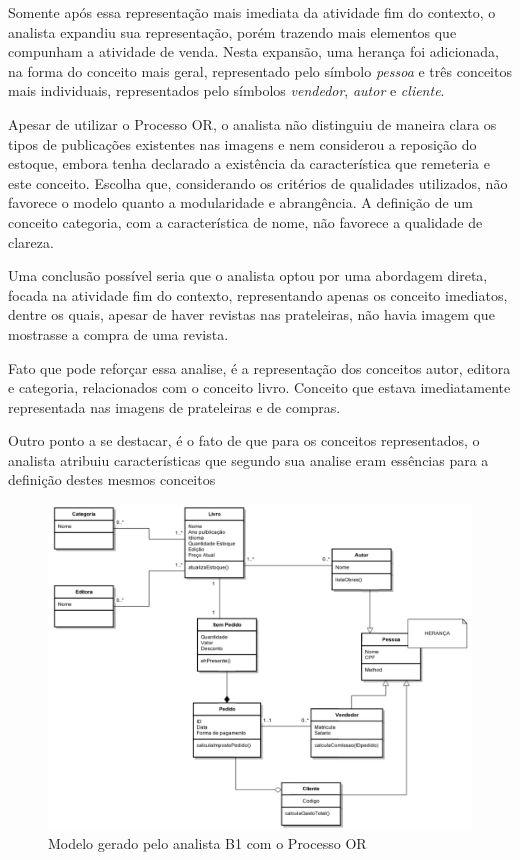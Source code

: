 Somente após essa representação mais imediata da atividade fim do contexto, o analista expandiu sua representação, porém trazendo mais elementos que compunham a atividade de venda. Nesta expansão, uma herança foi adicionada, na forma do conceito mais geral, representado pelo símbolo \textit{pessoa} e três conceitos mais individuais, representados pelo símbolos \textit{vendedor}, \textit{autor} e \textit{cliente}.

Apesar de utilizar o Processo OR, o analista não distinguiu de maneira clara os tipos de publicações existentes nas imagens e nem considerou a reposição do estoque, embora tenha declarado a existência da característica que remeteria e este conceito. Escolha que, considerando os critérios de qualidades utilizados, não favorece o modelo quanto a modularidade e abrangência. A definição de um conceito categoria, com a característica de nome, não favorece a qualidade de clareza.  

Uma conclusão possível seria que o analista optou por uma abordagem direta, focada na atividade fim do contexto, representando apenas os conceito imediatos, dentre os quais, apesar de haver revistas nas prateleiras, não havia imagem que mostrasse a compra de uma revista.

Fato que pode reforçar essa analise, é a representação dos conceitos autor, editora e categoria, relacionados com o conceito livro. Conceito que estava imediatamente representada nas imagens de prateleiras e de compras.

Outro ponto a se destacar, é o fato de que para os conceitos representados, o analista atribuiu características que segundo sua analise eram essências para a definição destes mesmos conceitos

\begin{figure}[!ht]
    \centering
    \includegraphics[width=\textwidth]{imagens/Modelo_001_Igor.png}
    \caption{Modelo gerado pelo analista B1 com o Processo OR}
    \label{fig:modeloB1001}
\end{figure}


